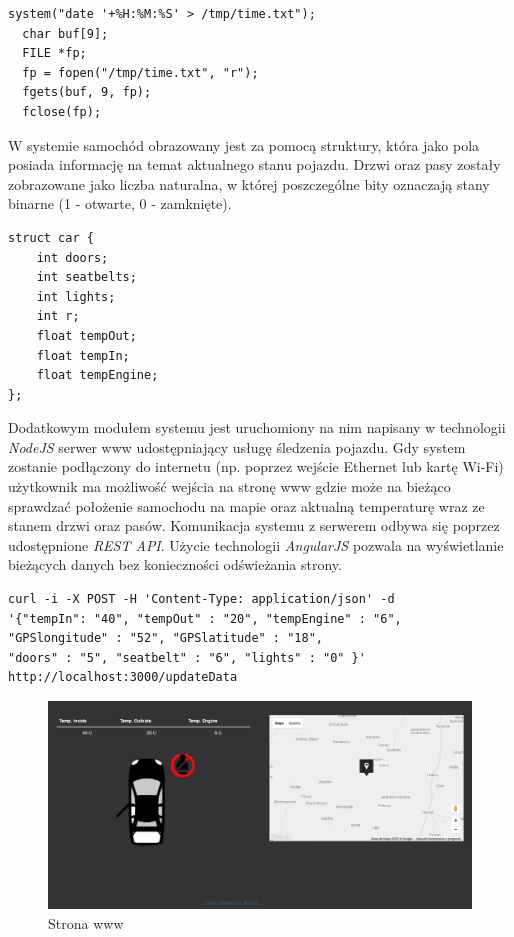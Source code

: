 \documentclass{xmgr}
\begin{document}
\begin{lstlisting}[label=bot-dirs-alg,caption=Odczyt aktualnej daty]
  system("date '+%H:%M:%S' > /tmp/time.txt");
  char buf[9];
  FILE *fp;
  fp = fopen("/tmp/time.txt", "r");
  fgets(buf, 9, fp);
  fclose(fp);
\end{lstlisting}

W systemie samochód obrazowany jest za pomocą struktury, która jako pola posiada informację na temat aktualnego stanu pojazdu. Drzwi oraz pasy zostały zobrazowane jako liczba naturalna, w której poszczególne bity oznaczają stany binarne (1 - otwarte, 0 - zamknięte).

\begin{lstlisting}[label=bot-dirs-alg,caption=Struktura samochodu w programie]
struct car {
	int doors;
 	int seatbelts;
 	int lights;         
 	int r;
 	float tempOut;
 	float tempIn;
 	float tempEngine;
};
\end{lstlisting}

Dodatkowym modułem systemu jest uruchomiony na nim napisany w technologii \emph{NodeJS} serwer www udostępniający usługę śledzenia pojazdu. Gdy system zostanie podłączony do internetu (np. poprzez wejście Ethernet lub kartę Wi-Fi) użytkownik ma możliwość wejścia na stronę www gdzie może na bieżąco sprawdzać położenie samochodu na mapie oraz aktualną temperaturę wraz ze stanem drzwi oraz pasów. Komunikacja systemu z serwerem odbywa się poprzez udostępnione \emph{REST API}. Użycie technologii \emph{AngularJS} pozwala na wyświetlanie bieżących danych bez konieczności odświeżania strony.

\begin{lstlisting}[label=bot-dirs-alg,caption=Request wysyłany do serwera www]
curl -i -X POST -H 'Content-Type: application/json' -d 
'{"tempIn": "40", "tempOut" : "20", "tempEngine" : "6", 
"GPSlongitude" : "52", "GPSlatitude" : "18", 
"doors" : "5", "seatbelt" : "6", "lights" : "0" }' 
http://localhost:3000/updateData
\end{lstlisting}

\begin{figure}[!h]
    \centering
    	\includegraphics[height=0.3\textheight]{images/www.png}
    \caption{Strona www}
\end{figure}
\end{document}
